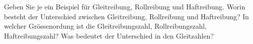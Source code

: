 %
\begin{aufgabe}
	Geben Sie je ein Beispiel für Gleitreibung, Rollreibung und Haftreibung.
	Worin besteht der Unterschied zwischen Gleitreibung, Rollreibung und Haftreibung?
	In welcher Grössenordung ist die Gleitreibungszahl, Rollreibungszahl, Haftreibungszahl?
	Was bedeutet der Unterschied in den Gleitzahlen?
\end{aufgabe}

